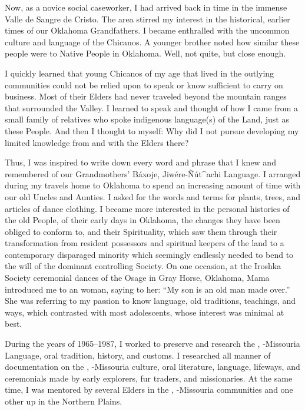 \documentclass[output=paper]{LSP/langsci}
\begin{document}
Now, as a novice social caseworker, I had arrived back in time in the immense Valle de Sangre de Cristo. The area stirred my interest in the historical, earlier times of our Oklahoma Grandfathers. I became enthralled with the uncommon culture and language of the Chicanos. A younger brother noted how similar these people were to Native People in Oklahoma. Well, not quite, but close enough.

I quickly learned that young Chicanos of my age that lived in the outlying communities could not be relied upon to speak  or know sufficient  to carry on business. Most of their Elders had never traveled beyond the mountain ranges that surrounded the Valley. I learned to speak  and thought of how I came from a small family of relatives who spoke indigenous language(s) of the Land, just as these People. And then I thought to myself: Why did I not pursue developing my limited knowledge from and with the Elders there?

Thus, I was inspired to write down every word and phrase that I knew and remembered of our Grandmothers' Báxoje, Jiwére-\~Nút\^{ }achi Language. I arranged during my travels home to Oklahoma to spend an increasing amount of time with our old Uncles and Aunties. I asked for the words and terms for plants, trees, and articles of dance clothing. I became more interested in the personal histories of the old People, of their early days in Oklahoma, the changes they have been obliged to conform to, and their Spirituality, which saw them through their transformation from resident possessors and spiritual keepers of the land to a contemporary disparaged minority which seemingly endlessly needed to bend to the will of the dominant controlling Society. On one occasion, at the Iroshka Society ceremonial dances of the O\-sage in Gray Horse, Oklahoma, Mama introduced me to an  woman, saying to her: ``My son is an old man made over.'' She was referring to my passion to know language, old traditions, teachings, and ways, which contrasted with most adolescents, whose interest was minimal at best.

During the years of 1965--1987, I worked to preserve and research the , -Missouria Language, oral tradition, history, and customs. I researched all manner of documentation on the , -Missouria culture, oral literature, language, lifeways, and ceremonials made by early explorers, fur traders, and missionaries. At the same time, I was mentored by several Elders in the , -Missouria communities and one other up in the Northern Plains.
\end{document}
